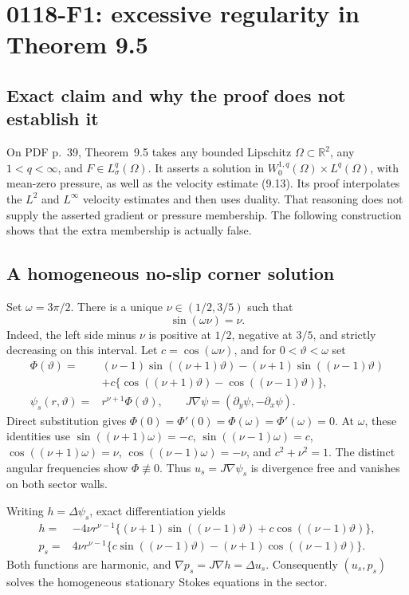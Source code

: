 \documentclass[10pt]{article}
\begin{document}
\section*{0118-F1: excessive regularity in Theorem 9.5}
\subsection*{Exact claim and why the proof does not establish it}
On PDF p. 39, Theorem 9.5 takes any bounded Lipschitz \(\Omega\subset\mathbb R^2\), any \(1<q<\infty\), and \(F\in L^q_\sigma(\Omega)\). It asserts a solution in \(W^{1,q}_0(\Omega)\times L^q(\Omega)\), with mean-zero pressure, as well as the velocity estimate (9.13). Its proof interpolates the \(L^2\) and \(L^\infty\) velocity estimates and then uses duality. That reasoning does not supply the asserted gradient or pressure membership. The following construction shows that the extra membership is actually false.\par
\subsection*{A homogeneous no-slip corner solution}
Set \(\omega=3\pi/2\). There is a unique \(\nu\in(1/2,3/5)\) such that \[\sin(\omega\nu)=\nu.\] Indeed, the left side minus \(\nu\) is positive at \(1/2\), negative at \(3/5\), and strictly decreasing on this interval. Let \(c=\cos(\omega\nu)\), and for \(0<\vartheta<\omega\) set \[\begin{split}
 \Phi(\vartheta)
  ={}&(\nu-1)\sin((\nu+1)\vartheta)
      -(\nu+1)\sin((\nu-1)\vartheta)\\
     &+c\{\cos((\nu+1)\vartheta)-\cos((\nu-1)\vartheta)\},\\
 \psi_s(r,\vartheta)={}&r^{\nu+1}\Phi(\vartheta),
 \qquad J\nabla\psi=(\partial_y\psi,-\partial_x\psi).
\end{split}\] Direct substitution gives \(\Phi(0)=\Phi'(0)=\Phi(\omega)=\Phi'(\omega)=0\). At \(\omega\), these identities use \(\sin((\nu+1)\omega)=-c\), \(\sin((\nu-1)\omega)=c\), \(\cos((\nu+1)\omega)=\nu\), \(\cos((\nu-1)\omega)=-\nu\), and \(c^2+\nu^2=1\). The distinct angular frequencies show \(\Phi\not\equiv0\). Thus \(u_s=J\nabla\psi_s\) is divergence free and vanishes on both sector walls.\par
Writing \(h=\Delta\psi_s\), exact differentiation yields \[\begin{split}
 h={}&-4\nu r^{\nu-1}
 \{(\nu+1)\sin((\nu-1)\vartheta)
                 +c\cos((\nu-1)\vartheta)\},\\
 p_s={}&4\nu r^{\nu-1}
 \{c\sin((\nu-1)\vartheta)
                 -(\nu+1)\cos((\nu-1)\vartheta)\}.
\end{split}\] Both functions are harmonic, and \(\nabla p_s=J\nabla h=\Delta u_s\). Consequently \((u_s,p_s)\) solves the homogeneous stationary Stokes equations in the sector.\par
\end{document}
